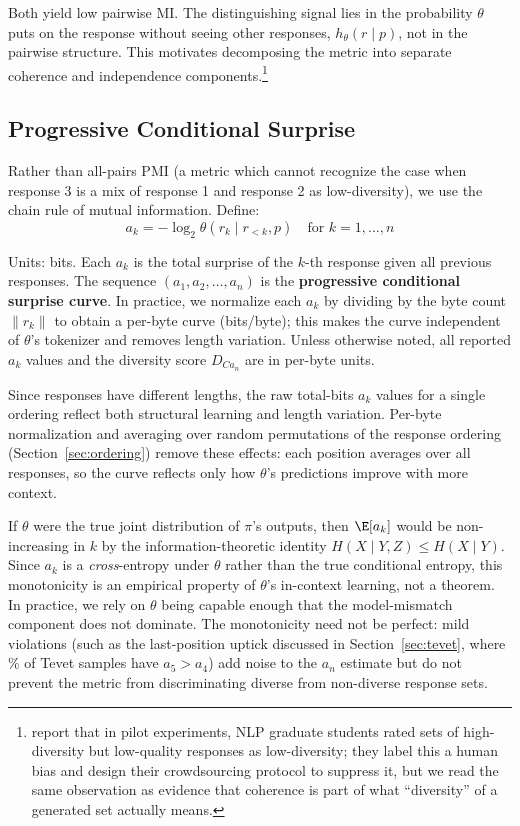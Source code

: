 Both yield low pairwise MI.
The distinguishing signal lies in the probability $\theta$ puts on the response without seeing other responses, $h_\theta(r \mid p)$, not in the pairwise structure.
This motivates decomposing the metric into separate coherence and independence components.\footnote{\citet{tevet2020evaluating} report that in pilot experiments, NLP graduate students rated sets of high-diversity but low-quality responses as low-diversity; they label this a human bias and design their crowdsourcing protocol to suppress it, but we read the same observation as evidence that coherence is part of what ``diversity'' of a generated set actually means.}

\subsection{Progressive Conditional Surprise}\label{sec:progressive-conditioning}

Rather than all-pairs PMI (a metric which cannot recognize the case when response 3 is a mix of response 1 and response 2 as low-diversity), we use the chain rule of mutual information.
Define:
\begin{equation}\label{eq:ak}
    a_k = -\log_2 \theta(r_k \mid r_{<k}, p) \quad \text{for } k = 1, \ldots, n
\end{equation}

Units: bits.
Each $a_k$ is the total surprise of the $k$-th response given all previous responses.
The sequence $(a_1, a_2, \ldots, a_n)$ is the \textbf{progressive conditional surprise curve}.
In practice, we normalize each $a_k$ by dividing by the byte count $\|r_k\|$ to obtain a per-byte curve (bits/byte); this makes the curve independent of $\theta$'s tokenizer and removes length variation.
Unless otherwise noted, all reported $a_k$ values and the diversity score $D_{Ca_n}$ are in per-byte units.

Since responses have different lengths, the raw total-bits $a_k$ values for a single ordering reflect both structural learning and length variation.
Per-byte normalization and averaging over random permutations of the response ordering (Section~\ref{sec:ordering}) remove these effects: each position averages over all responses, so the curve reflects only how $\theta$'s predictions improve with more context.

If $\theta$ were the true joint distribution of $\pi$'s outputs, then $\E[a_k]$ would be non-increasing in $k$ by the information-theoretic identity $H(X \mid Y, Z) \leq H(X \mid Y)$.
Since $a_k$ is a \emph{cross}-entropy under $\theta$ rather than the true conditional entropy, this monotonicity is an empirical property of $\theta$'s in-context learning, not a theorem.
In practice, we rely on $\theta$ being capable enough that the model-mismatch component does not dominate.
The monotonicity need not be perfect: mild violations (such as the last-position uptick discussed in Section~\ref{sec:tevet}, where \tevetLastUptickPct\% of Tevet samples have $a_5 > a_4$) add noise to the $a_n$ estimate but do not prevent the metric from discriminating diverse from non-diverse response sets.

